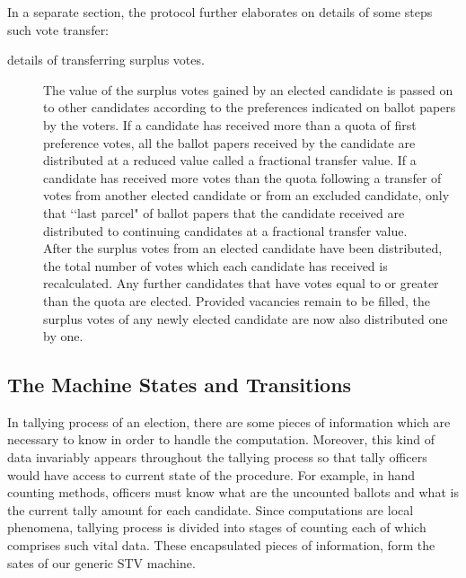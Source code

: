 \documentclass{llncs}
\begin{document}
In a separate section, the protocol further elaborates on details of some steps such vote transfer:
\begin{description}
\item[details of transferring surplus votes.] 
The value of the surplus votes gained by an elected candidate is passed on to other candidates according to the preferences indicated on ballot papers by the voters. If a candidate has received more than a quota of first preference votes, all the ballot papers received by the candidate are distributed at a reduced value called a fractional transfer value. If a candidate has received more votes than the quota following a transfer of votes from another elected candidate or from an excluded candidate, only that \lq\lq last parcel" of ballot papers that the candidate received are distributed to continuing candidates at a fractional transfer value.\\

After the surplus votes from an elected candidate have been distributed, the total number of votes which each candidate has received is recalculated. Any further candidates that have votes equal to or greater than the quota are elected. Provided vacancies remain to be filled, the surplus votes of any newly elected candidate are now also distributed one by one.
\end{description}
\subsection{The Machine States and Transitions}
In tallying process of an election, there are some pieces of information which are necessary to know in order to handle the computation. Moreover, this  kind of data invariably appears throughout the tallying process so that tally officers would have access to current state of the procedure. For example, in hand counting methods, officers must know what are the uncounted ballots and what is the current tally amount for each candidate. Since computations are local phenomena, tallying process is divided into stages of counting each of which comprises such vital data. These encapsulated pieces of information, form the sates of our generic STV machine. 
\end{document}
